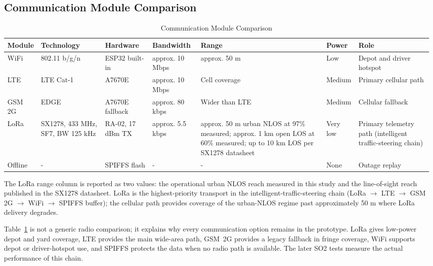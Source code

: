 \subsection{Communication Module Comparison}

\addtocounter{table}{-1}
\begin{table}[!htbp]
\centering
\caption{Communication Module Comparison}
\label{tab:communication_module_comparison}
\scriptsize
\setlength{\tabcolsep}{2pt}
\renewcommand{\arraystretch}{1.15}
\begin{tabular}{|p{}|p{}|p{}|p{}|p{}|p{}|p{}|}
\hline
\textbf{Module} & \textbf{Technology} & \textbf{Hardware} & \textbf{Bandwidth} & \textbf{Range} & \textbf{Power} & \textbf{Role} \\
\hline
WiFi & 802.11 b/g/n & ESP32 built-in & approx. 10 Mbps & approx. 50 m & Low & Depot and driver hotspot \\
\hline
LTE & LTE Cat-1 & A7670E & approx. 10 Mbps & Cell coverage & Medium & Primary cellular path \\
\hline
GSM 2G & EDGE & A7670E fallback & approx. 80 kbps & Wider than LTE & Medium & Cellular fallback \\
\hline
LoRa & SX1278, 433 MHz, SF\glsadd{SF}7, BW\glsadd{BW} 125 kHz & RA-02, 17 dBm TX & approx. 5.5 kbps & approx. 50 m urban NLOS\glsadd{NLOS} at 97\% measured; approx. 1 km open LOS\glsadd{LOS} at 60\% measured; up to 10 km LOS per SX1278 datasheet & Very low & Primary telemetry path (intelligent traffic-steering chain) \\
\hline
Offline & - & SPIFFS flash & - & - & None & Outage replay \\
\hline
\end{tabular}
\normalsize
\end{table}

The LoRa range column is reported as two values: the operational urban NLOS reach measured in this study and the line-of-sight reach published in the SX1278 datasheet. LoRa is the highest-priority transport in the intelligent-traffic-steering chain (LoRa $\rightarrow$ LTE $\rightarrow$ GSM 2G $\rightarrow$ WiFi $\rightarrow$ SPIFFS buffer); the cellular path provides coverage of the urban-NLOS regime past approximately 50 m where LoRa delivery degrades.

Table~\ref{tab:communication_module_comparison} is not a generic radio comparison; it explains why every communication option remains in the prototype. LoRa gives low-power depot and yard coverage, LTE provides the main wide-area path, GSM~2G provides a legacy fallback in fringe coverage, WiFi supports depot or driver-hotspot use, and SPIFFS protects the data when no radio path is available. The later SO2 tests measure the actual performance of this chain.

